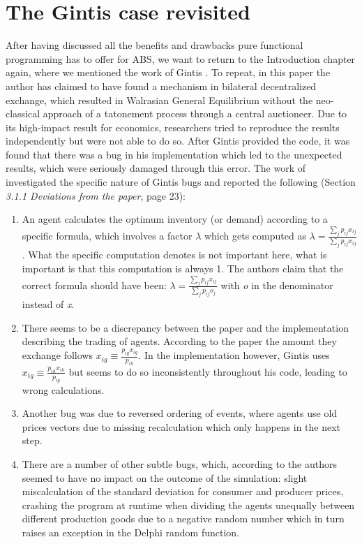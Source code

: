 \section{The Gintis case revisited}
\label{sec:gintis_case} 
After having discussed all the benefits and drawbacks pure functional programming has to offer for ABS, we want to return to the Introduction chapter again, where we mentioned the work of Gintis \cite{gintis_emergence_2006}. To repeat, in this paper the author has claimed to have found a mechanism in bilateral decentralized exchange, which resulted in Walrasian General Equilibrium without the neo-classical approach of a tatonement process through a central auctioneer. Due to its high-impact result for economics, researchers \cite{ionescu_dependently-typed_2012} tried to reproduce the results independently but were not able to do so. After Gintis provided the code, it was found that there was a bug in his implementation which led to the unexpected results, which were seriously damaged through this error. The work of \cite{evensen_extensible_2010} investigated the specific nature of Gintis bugs and reported the following (Section \textit{3.1.1  Deviations from the paper}, page 23):

\begin{enumerate}
	\item An agent calculates the optimum inventory (or demand) according to a specific formula, which involves a factor $\lambda$ which gets computed as $\lambda = \frac{\sum_{j}{} p_{ij}x_{ij}}{\sum_{j}{} p_{ij}x_{ij}}$. What the specific computation denotes is not important here, what is important is that this computation is always 1. The authors \cite{evensen_extensible_2010} claim that the correct formula should have been: $\lambda = \frac{\sum_{j}{} p_{ij}x_{ij}}{\sum_{j}{} p_{ij}o_{j}}$ with \textit{o} in the denominator instead of \textit{x}. 
	
	\item There seems to be a discrepancy between the paper and the implementation describing the trading of agents. According to the paper the amount they exchange follows $x_{ig} \equiv \frac{p_{ig}x_{ig}}{p_{ih}}$. In the implementation however, Gintis uses $x_{ig} \equiv \frac{p_{ih}x_{ih}}{p_{ig}}$ but seems to do so inconsistently throughout his code, leading to wrong calculations.
	
	\item Another bug was due to reversed ordering of events, where agents use old prices vectors due to missing recalculation which only happens in the next step.

	\item There are a number of other subtle bugs, which, according to the authors \cite{evensen_extensible_2010} seemed to have no impact on the outcome of the simulation: slight miscalculation of the standard deviation for consumer and producer prices, crashing the program at runtime when dividing the agents unequally between different production goods due to a negative random number which in turn raises an exception in the Delphi random function.
\end{enumerate}

